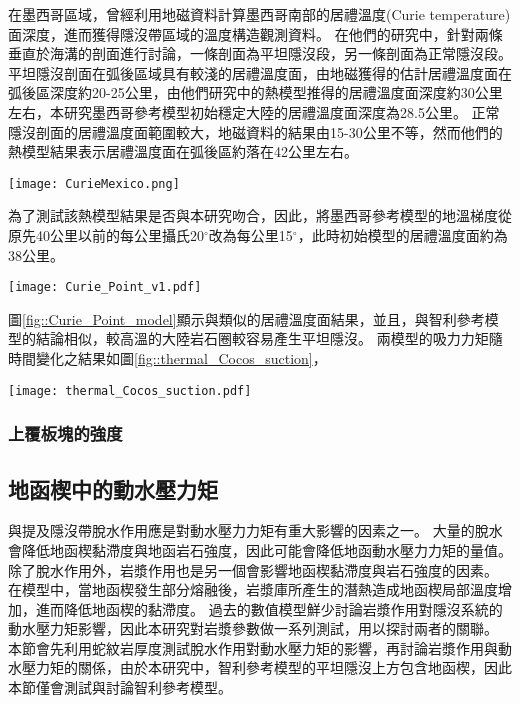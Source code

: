 在墨西哥區域，\citealp{Manea2011Curie}曾經利用地磁資料計算墨西哥南部的居禮溫度(Curie temperature)面深度，進而獲得隱沒帶區域的溫度構造觀測資料。
在他們的研究中，針對兩條垂直於海溝的剖面進行討論，一條剖面為平坦隱沒段，另一條剖面為正常隱沒段。
平坦隱沒剖面在弧後區域具有較淺的居禮溫度面，由地磁獲得的估計居禮溫度面在弧後區深度約20-25公里，由他們研究中的熱模型推得的居禮溫度面深度約30公里左右，本研究墨西哥參考模型初始穩定大陸的居禮溫度面深度為28.5公里。
正常隱沒剖面的居禮溫度面範圍較大，地磁資料的結果由15-30公里不等，然而他們的熱模型結果表示居禮溫度面在弧後區約落在42公里左右。
\begin{figure*}[h]
    \centering
    \texttt{[image: CurieMexico.png]}
    \caption[墨西哥兩條剖面的居禮溫度面與熱構造模型]{墨西哥兩條剖面的居禮溫度面與熱構造模型，摘自\citealp{Manea2011Curie}}
    \label{fig::CurieMexico}
\end{figure*}

為了測試該熱模型結果是否與本研究吻合，因此，將墨西哥參考模型的地溫梯度從原先40公里以前的每公里攝氏20$^\circ$改為每公里15$^\circ$，此時初始模型的居禮溫度面約為38公里。
\begin{figure*}[h]
    \centering
    \texttt{[image: Curie\_Point\_v1.pdf]}
    \caption[不同地溫梯度的墨西哥模型在30個百萬年的隱沒板塊構造與580$^\circ$等溫線]{不同地溫梯度的墨西哥模型在30個百萬年的隱沒板塊構造(黑線)於150公里以上之構造與580$^\circ$等溫線(紫線)，幾何形狀取自隱沒板塊頂部，使用5公里移動平均平滑離散化的網格。}
    \label{fig::Curie_Point_model}
\end{figure*}

圖\ref{fig::Curie_Point_model}顯示與\citealp{Manea2011Curie}類似的居禮溫度面結果，並且，與智利參考模型的結論相似，較高溫的大陸岩石圈較容易產生平坦隱沒。
兩模型的吸力力矩隨時間變化之結果如圖\ref{fig::thermal_Cocos_suction}，
\begin{figure*}[h]
    \centering
    \texttt{[image: thermal\_Cocos\_suction.pdf]}
    \caption[不同地溫梯度的墨西哥模型之吸力力矩。]{}
    \label{fig::thermal_Cocos_suction}
\end{figure*}

\subsubsection{上覆板塊的強度}


\subsection{地函楔中的動水壓力矩}
\citealp{Manea2017}與\citealp{Yan2020}提及隱沒帶脫水作用應是對動水壓力力矩有重大影響的因素之一。
大量的脫水會降低地函楔黏滯度與地函岩石強度，因此可能會降低地函動水壓力力矩的量值。
除了脫水作用外，岩漿作用也是另一個會影響地函楔黏滯度與岩石強度的因素。
在模型中，當地函楔發生部分熔融後，岩漿庫所產生的潛熱造成地函楔局部溫度增加，進而降低地函楔的黏滯度。
過去的數值模型鮮少討論岩漿作用對隱沒系統的動水壓力矩影響，因此本研究對岩漿參數做一系列測試，用以探討兩者的關聯。
本節會先利用蛇紋岩厚度測試脫水作用對動水壓力矩的影響，再討論岩漿作用與動水壓力矩的關係，由於本研究中，智利參考模型的平坦隱沒上方包含地函楔，因此本節僅會測試與討論智利參考模型。
